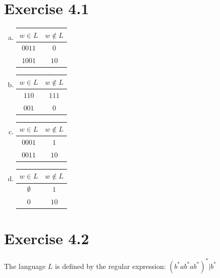 \documentclass{article} %
\newcommand{\homeworkNumber}{4}
\begin{document}
\section*{Exercise \homeworkNumber.1}
\begin{enumerate}[(a)]
	\item
	\renewcommand{\arraystretch}{1.25}
	\begin{tabular}{ c | c }
	$w \in L$ & $w \notin L$\\
	\hline
	$0011$ & $0$\\
	$1001$ & $10$
	\end{tabular}
	
	\item
	\begin{tabular}{ c | c }
	$w \in L$ & $w \notin L$\\
	\hline
	$110$ & $111$\\
	$001$ & $0$
	\end{tabular}
	
	\item
	\begin{tabular}{ c | c }
	$w \in L$ & $w \notin L$\\
	\hline
	$0001$ & $1$\\
	$0011$ & $10$
	\end{tabular}
	
	\item
	\begin{tabular}{ c | c }
	$w \in L$ & $w \notin L$\\
	\hline
	$\emptyset$ & $1$\\
	$0$ & $10$
	\end{tabular}
	
\end{enumerate}


\section*{Exercise \homeworkNumber.2}
The language $L$ is defined by the regular expression: $(b^*ab^*ab^*)^*|b^*$
\end{document}
